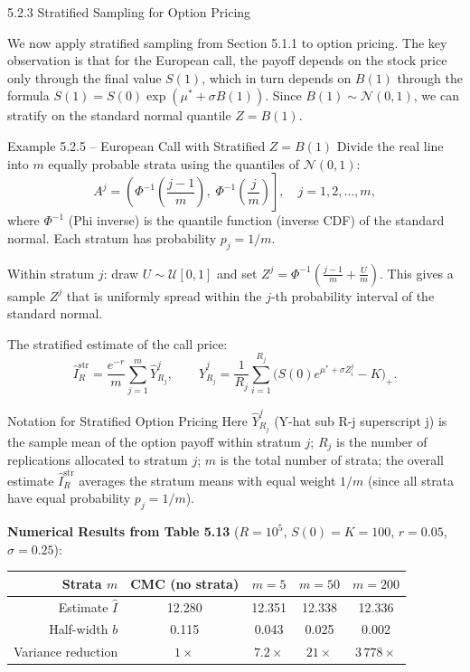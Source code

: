 \documentclass[aspectratio=169,10pt]{beamer}
\begin{document}
\begin{frame}[allowframebreaks]{5.2.3 Stratified Sampling for Option Pricing}

We now apply stratified sampling from Section 5.1.1 to option pricing.  The key
observation is that for the European call, the payoff depends on the stock price
only through the final value $S(1)$, which in turn depends on $B(1)$ through the
formula $S(1) = S(0)\exp(\mu^* + \sigma B(1))$.  Since $B(1) \sim \mathcal{N}(0,1)$,
we can stratify on the standard normal quantile $Z = B(1)$.

\begin{block}{Example 5.2.5 -- European Call with Stratified $Z = B(1)$}
  Divide the real line into $m$ equally probable strata using the quantiles of
  $\mathcal{N}(0,1)$:
  \[
    A^j = \left(\Phi^{-1}\!\left(\frac{j-1}{m}\right),\; \Phi^{-1}\!\left(\frac{j}{m}\right)\right],
    \quad j = 1, 2, \ldots, m,
  \]
  where $\Phi^{-1}$ (Phi inverse) is the quantile function (inverse CDF) of
  the standard normal.  Each stratum has probability $p_j = 1/m$.

  Within stratum $j$: draw $U \sim \mathcal{U}[0,1]$ and set
  $Z^j = \Phi^{-1}\!\left(\frac{j-1}{m} + \frac{U}{m}\right)$.
  This gives a sample $Z^j$ that is uniformly spread within the $j$-th
  probability interval of the standard normal.

  The stratified estimate of the call price:
  \[
    \hat{I}_R^{\mathrm{str}} = \frac{e^{-r}}{m}\sum_{j=1}^m \hat{Y}_{R_j}^j,
    \qquad
    \hat{Y}_{R_j}^j = \frac{1}{R_j}\sum_{i=1}^{R_j}
    \bigl(S(0)e^{\mu^* + \sigma Z_i^j} - K\bigr)_+.
  \]
\end{block}

\framebreak

\begin{block}{Notation for Stratified Option Pricing}
  Here $\hat{Y}_{R_j}^j$ (Y-hat sub R-j superscript j) is the sample mean of
  the option payoff within stratum $j$; $R_j$ is the number of replications
  allocated to stratum $j$; $m$ is the total number of strata; the overall
  estimate $\hat{I}_R^{\mathrm{str}}$ averages the stratum means with equal
  weight $1/m$ (since all strata have equal probability $p_j = 1/m$).
\end{block}

\textbf{Numerical Results from Table 5.13}
($R = 10^5$, $S(0) = K = 100$, $r = 0.05$, $\sigma = 0.25$):

\begin{center}\small
  \begin{tabular}{rcccc}
    \toprule
    Strata $m$ & CMC (no strata) & $m = 5$ & $m = 50$ & $m = 200$ \\
    \midrule
    Estimate $\hat{I}$ & 12.280 & 12.351 & 12.338 & 12.336 \\
    Half-width $b$ & 0.115 & 0.043 & 0.025 & 0.002 \\
    Variance reduction & $1\times$ & $7.2\times$ & $21\times$ & $3\,778\times$ \\
    \bottomrule
  \end{tabular}
\end{center}


\end{frame}
\end{document}
